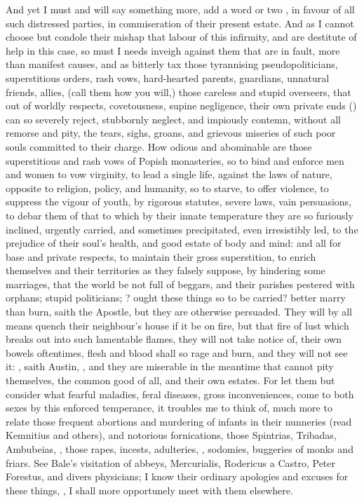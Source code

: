 {And yet I must and will say something more, add a word or two , in favour of all such distressed parties, in
commiseration of their present estate. And as I cannot choose but condole their
mishap that labour of this infirmity, and are destitute of help in this case,
so must I needs inveigh against them that are in fault, more than manifest
causes, and as bitterly tax those tyrannising pseudopoliticians, superstitious
orders, rash vows, hard-hearted parents, guardians, unnatural friends, allies,
(call them how you will,) those careless and stupid overseers, that out of
worldly respects, covetousness, supine negligence, their own private ends
() can so severely reject, stubbornly neglect,
and impiously contemn, without all remorse and pity, the tears, sighs, groans,
and grievous miseries of such poor souls committed to their charge. How odious
and abominable are those superstitious and rash vows of Popish monasteries, so
to bind and enforce men and women to vow virginity, to lead a single life,
against the laws of nature, opposite to religion, policy, and humanity, so to
starve, to offer violence, to suppress the vigour of youth, by rigorous
statutes, severe laws, vain persuasions, to debar them of that to which by
their innate temperature they are so furiously inclined, urgently carried, and
sometimes precipitated, even irresistibly led, to the prejudice of their soul's
health, and good estate of body and mind: and all for base and private
respects, to maintain their gross superstition, to enrich themselves and their
territories as they falsely suppose, by hindering some marriages, that the
world be not full of beggars, and their parishes pestered with orphans; stupid
politicians; ? ought these things so to be carried?
better marry than burn, saith the Apostle, but they are otherwise persuaded.
They will by all means quench their neighbour's house if it be on fire, but
that fire of lust which breaks out into such lamentable flames, they will not
take notice of, their own bowels oftentimes, flesh and blood shall so rage and
burn, and they will not see it: , saith Austin, , and they are miserable in the meantime that cannot pity
themselves, the common good of all, and  their own estates.
For let them but consider what fearful maladies, feral diseases, gross
inconveniences, come to both sexes by this enforced temperance, it troubles me
to think of, much more to relate those frequent abortions and murdering of
infants in their nunneries (read Kemnitius and others),
and notorious fornications, those Spintrias, Tribadas, Ambubeias, \etc{}, those
rapes, incests, adulteries, , sodomies,
buggeries of monks and friars. See Bale's visitation of abbeys,
Mercurialis, Rodericus a Castro, Peter Forestus, and
divers physicians; I know their ordinary apologies and excuses for these
things, , I shall more opportunely
meet with them elsewhere.


}
